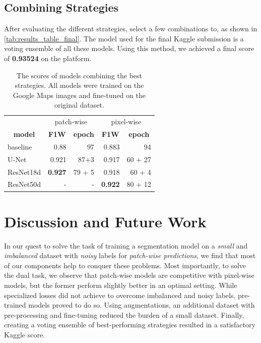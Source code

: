 \documentclass[10pt,conference,compsocconf]{IEEEtran}
\begin{document}
\subsection{Combining Strategies}
After evaluating the different strategies, select a few combinations to, as shown in \autoref{tab:results_table_final}. The model used for the final Kaggle submission is a voting ensemble of all these models. Using this method, we achieved a final score of \textbf{0.93524} on the platform.
\begin{table}[ht!]
    \centering
    \begin{tabular}{l|rr|rr}
        \toprule
        \multicolumn{1}{c}{} &
        \multicolumn{2}{c}{patch-wise} &
        \multicolumn{2}{c}{pixel-wise} \\
        \multicolumn{1}{c}{\textbf{model}} &
        \multicolumn{1}{c}{\textbf{F1W}} &
        \multicolumn{1}{c}{\textbf{epoch}} &
        \multicolumn{1}{c}{\textbf{F1W}} &
        \multicolumn{1}{c}{\textbf{epoch}} \\
        \midrule
            baseline & 0.88 & 97 & 0.883 & 94 \\
            U-Net & 0.921 & 87+3 & 0.917 & 60 + 27 \\
            ResNet18d & \textbf{0.927} & 79 + 5 & 0.918 & 60 + 4 \\
            ResNet50d & - & - & \textbf{0.922} & 80 + 12 \\
        \bottomrule
    \end{tabular}
    \caption{The scores of models combining the best strategies. All models were trained on the Google Maps images and fine-tuned on the original dataset.}
    \label{tab:results_table_final}
    \vspace{-0.1cm}
\end{table}

\section{Discussion and Future Work}
In our quest to solve the task of training a segmentation model on a \emph{small} and \emph{imbalanced} dataset with \emph{noisy} labels for \emph{patch-wise predictions}, we find that most of our components help to conquer these problems. Most importantly, to solve the dual task, we observe that patch-wise models are competitive with pixel-wise models, but the former perform slightly better in an optimal setting. While specialized losses did not achieve to overcome imbalanced and noisy labels, pre-trained models proved to do so. Using augmentations, an additional dataset with pre-processing and fine-tuning reduced the burden of a small dataset. Finally, creating a voting ensemble of best-performing strategies resulted in a satisfactory Kaggle score.
\end{document}
